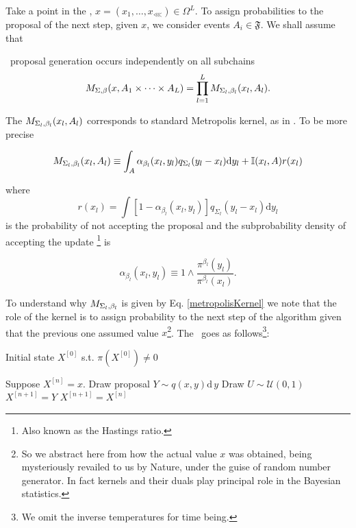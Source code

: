 Take a point in the \sspace, $x = (x_1, \dots, x_\lll) \in \Omega^L$. To assign probabilities to the proposal of the next step, given $x$, we consider events $A_i \in \mathfrak{F}$. We shall assume that 

\begin{assumptions}[resume]
	\item{
		\randomWalk\, proposal generation occurs independently on all subchains 	
		$$M_{\Sigma,\beta} (x, A_1 \times \dots \times A_L) = \prod_{l=1}^L M_{\Sigma_{l},\beta_{l}}(x_l, A_l).$$
	}
\end{assumptions}

The $M_{\Sigma_{l},\beta_{l}}(x_l, A_l)$ corresponds to standard Metropolis kernel, as in \citet*{CharlesJ.Geyer}. To be more precise

\begin{equation}\label{metropolisKernel}
	M_{\Sigma_{l},\beta_{l}}(x_l, A_l) \equiv \int_A \alpha_{\beta_l} (x_l, y_l) q_{\Sigma_l} (y_l - x_l) \mathrm{d }y_l + \mathbb{I}(x_l,A) r(x_l) 	
\end{equation}

where 
$$r(x_l) = \int [1 - \alpha_{\beta_l} (x_l, y_l)] q_{\Sigma_l} (y_l - x_l) \mathrm{d }y_l$$
is the probability of not accepting the proposal and the subprobability density of accepting the update \footnote{Also known as the Hastings ratio.} is

\begin{equation}\label{acceptance prob}
	\alpha_{\beta_l} (x_l, y_l)  \equiv 1 \wedge \frac{\pi^{\beta_l}(y_l)}{\pi^{\beta_l}(x_l)}.
\end{equation}

To understand why $M_{\Sigma_{l},\beta_{l}}$ is given by Eq. \ref{metropolisKernel} we note that the role of the kernel is to assign probability to the next step of the algorithm given that the previous one assumed value $x$\footnote{So we abstract here from how the actual value $x$ was obtained, being mysteriously revailed to us by Nature, under the guise of random number generator. In fact kernels and their duals play principal role in the Bayesian statistics.}. The \MH\, goes as follows\footnote{We omit the inverse temperatures for time being.}: 


\begin{Algo}
	Initial state $X^{[0]}$ s.t. $\pi(X^{[0]}) \not=0$
	
	\begin{algorithmic}
		\Repeat 
			\State Suppose $X^{[n]} = x$.
			\State Draw proposal $Y \sim q(x,y)\mathrm{d}\,y$
			\State Draw $U \sim \mathcal{U}(0,1)$
				\State $X^{[n+1]} = Y$	
			\Else
				\State $X^{[n+1]} = X^{[n]}$	
			\EndIf
	\end{algorithmic}		
\end{Algo}

